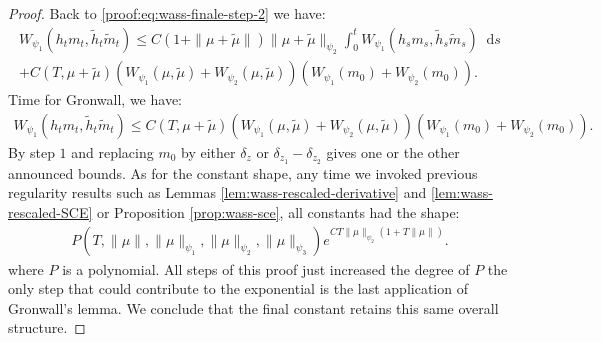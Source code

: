 \documentclass[11pt,a4paper]{article}
\newcommand{\dd}{\mathop{}\!\mathrm{d}}
\begin{document}
\begin{proof}
    Back to \eqref{proof:eq:wass-finale-step-2} we have:
    \begin{multline*}
        W_{\psi_1}\left(h_t m_t , \tilde{h}_t \tilde{m}_t \right) \leq C(1 + \|\mu + \tilde{\mu}\|)\|\mu + \tilde{\mu}\|_{\psi_2}\int_0^t W_{\psi_1}\left(h_s m_s , \tilde{h}_s \tilde{m}_s \right) \dd s \\
        + C(T,\mu + \tilde{\mu})\left(W_{\psi_1}\left( \mu , \tilde{\mu}\right) + W_{\psi_2}\left( \mu , \tilde{\mu}\right)\right)\left(W_{\psi_1}(m_0) + W_{\psi_2}(m_0) \right).
    \end{multline*}
    Time for Gronwall, we have:
    \begin{align*}
        W_{\psi_1}\left(h_t m_t , \tilde{h}_t \tilde{m}_t \right) \leq C(T,\mu + \tilde{\mu})\left(W_{\psi_1}\left( \mu , \tilde{\mu}\right) + W_{\psi_2}\left( \mu , \tilde{\mu}\right)\right)\left(W_{\psi_1}(m_0) + W_{\psi_2}(m_0) \right).
    \end{align*}
    By step $1$ and replacing $m_0$ by either $\delta_z$ or $\delta_{z_1} - \delta_{z_2}$ gives one or the other announced bounds. As for the constant shape, any time we invoked previous regularity results such as Lemmas \ref{lem:wass-rescaled-derivative} and \ref{lem:wass-rescaled-SCE} or Proposition \ref{prop:wass-sce}, all constants had the shape:
    \begin{align*}
        P(T,\|\mu\|,\|\mu\|_{\psi_1},\|\mu\|_{\psi_2},\|\mu\|_{\psi_3}) e^{CT\|\mu\|_{\psi_2}(1 + T\|\mu\|)}.
    \end{align*}
    where $P$ is a polynomial. All steps of this proof just increased the degree of $P$ the only step that could contribute to the exponential is the last application of Gronwall's lemma. We conclude that the final constant retains this same overall structure.
\end{proof}
\end{document}
